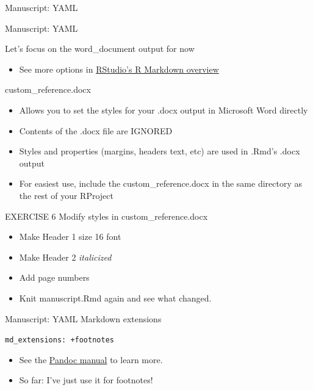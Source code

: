 \documentclass[
  ignorenonframetext,
]{beamer}
\providecommand{\tightlist}{%
  \setlength{\itemsep}{0pt}\setlength{\parskip}{0pt}}
\begin{document}
\begin{frame}[fragile]
\begin{block}{Manuscript: YAML}
\end{block}

\begin{block}{Manuscript: YAML}

Let's focus on the word\_document output for now

\begin{itemize}
\tightlist
\item
  See more options in
  \href{https://rmarkdown.rstudio.com/word_document_format.html}{RStudio's
  R Markdown overview}
\end{itemize}

\end{block}

\begin{block}{custom\_reference.docx}

\begin{itemize}
\tightlist
\item
  Allows you to set the styles for your .docx output in Microsoft Word
  directly
\item
  Contents of the .docx file are IGNORED
\item
  Styles and properties (margins, headers text, etc) are used in .Rmd's
  .docx output
\item
  For easiest use, include the custom\_reference.docx in the same
  directory as the rest of your RProject
\end{itemize}

\end{block}

\begin{block}{EXERCISE 6 \textbar{} Modify styles in
custom\_reference.docx}

\begin{itemize}
\tightlist
\item
  Make Header 1 size 16 font
\item
  Make Header 2 \emph{italicized}
\item
  Add page numbers
\item
  Knit manuscript.Rmd again and see what changed.
\end{itemize}

\end{block}

\begin{block}{Manuscript: YAML \textbar{} Markdown extensions}

\texttt{md\_extensions:\ +footnotes}

\begin{itemize}
\tightlist
\item
  See the \href{http://pandoc.org/MANUAL.html\#extensions}{Pandoc
  manual} to learn more.
\item
  So far: I've just use it for footnotes! 👣
\end{itemize}


\end{block}
\end{frame}
\end{document}
